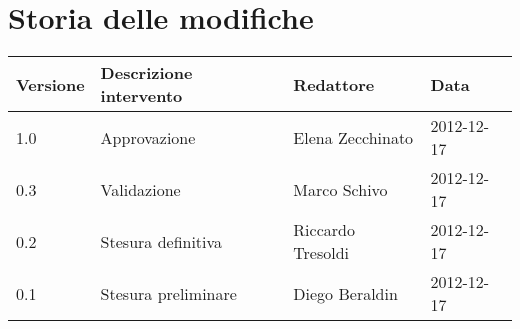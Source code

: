 \newcommand{\docName}{Glossario}
\newcommand{\docFileName}{glossario.tex}
\newcommand{\docVers}{1.0}
\newcommand{\creationDate}{2012-12-17}
\newcommand{\modificationDate}{2012-12-18}
\newcommand{\docState}{Approvato}
\newcommand{\docUsage}{Esterno}
\newcommand{\docAuthors}{Diego Beraldin\\ &Riccardo Tresoldi\\}
\newcommand{\approvedBy}{Elena Zecchinato\\}
\newcommand{\verifiedBy}{Marco Schivo\\}
\newcommand{\docRoot}{..}




\usepackage{fancybox}        %
\setlength{\shadowsize}{2pt} %
\newcommand{\letterbox}[1]{\noindent\shadowbox{\begin{minipage}[t]{.98\linewidth}\centering\large\uppercase{$\mathcal{#1}$}\end{minipage}}\newline}
\newcommand{\glossaryItem}[2]{\noindent\textbf{#1}\newline{}#2\newline}





\pagestyle{normal}

\section*{Storia delle modifiche}
\begin{tabularx}{\textwidth}{lXll}
\toprule
Versione & Descrizione intervento & Redattore & Data\\
\midrule %
1.0 & Approvazione & Elena Zecchinato & 2012-12-17\\
0.3 & Validazione & Marco Schivo & 2012-12-17\\
0.2 & Stesura definitiva & Riccardo Tresoldi & 2012-12-17\\
0.1 & Stesura preliminare & Diego Beraldin & 2012-12-17\\
\bottomrule
\end{tabularx}
\newpage

